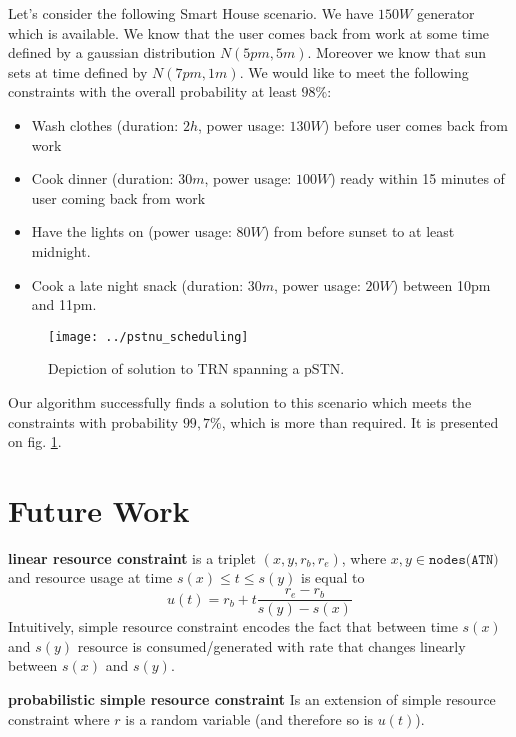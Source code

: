 \documentclass{article}
\begin{document}
\begin{multicols}{2}
Let's consider the following Smart House scenario. We have $150W$ generator which is available. We know that the user comes back from work at some time defined by a gaussian distribution $N(5pm, 5m)$. Moreover we know that sun sets at time defined by $N(7pm, 1m)$. We would like to meet the following constraints with the overall probability at least $98\%$:
\begin{itemize}
\item Wash clothes (duration: $2h$, power usage: $130W$) before user comes back from work
\item Cook dinner (duration: $30m$, power usage: $100W$) ready within 15 minutes of user coming back from work
\item Have the lights on (power usage: $80W$) from before sunset to at least midnight.
\item Cook a late night snack (duration: $30m$, power usage: $20W$) between 10pm and 11pm.
\end{itemize}


\begin{figure}[H]
\begin{center}
\texttt{[image: ../pstnu\_scheduling]}
\caption{Depiction of solution to TRN spanning a pSTN.}
\label{fig:pstnu_scheduling}
\end{center}
\end{figure}

Our algorithm successfully finds a solution to this scenario which meets the constraints with probability $99,7\%$, which is more than required. It is presented on fig. \ref{fig:pstnu_scheduling}.



\section{Future Work}
\textbf{linear resource constraint} is a triplet $(x, y, r_b, r_e)$, where $x, y \in \texttt{nodes(ATN)}$ and resource usage at time $s(x) \leq t \leq s(y)$ is equal to
\[
    u(t) = r_b + t  \frac{r_e - r_b}{s(y) - s(x)}
\]
Intuitively, simple resource constraint encodes the fact that between time $s(x)$ and $s(y)$  resource is consumed/generated with rate that changes linearly between $s(x)$ and $s(y)$.

\textbf{probabilistic simple resource constraint}
Is an extension of simple resource constraint where $r$ is a random variable (and therefore so is $u(t)$).





\end{multicols}
\end{document}
